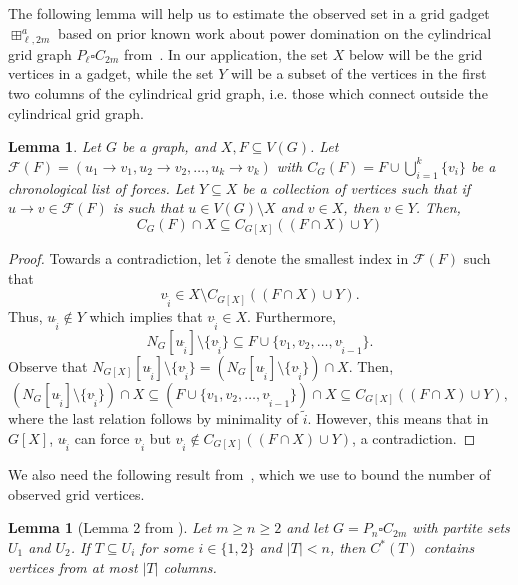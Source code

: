 \documentclass{article}
\newtheorem{lemma}[theorem]{Lemma}
\begin{document}
        The following lemma will help us to estimate the observed set in a grid gadget $\boxplus^a_{\ell,2m}$ based on prior known work about power domination on the cylindrical grid graph $P_{\ell}\square C_{2m}$ from~\cite{DH2006}.
        In our application, the set $X$ below will be the grid vertices in a gadget, while the set $Y$ will be a subset of the vertices in the first two columns of the cylindrical grid graph, i.e. those which connect outside the cylindrical grid graph. 

        \begin{lemma}\label{lemma forcing on an induced subgraph}
            Let $G$ be a graph, and $X, F\subseteq V(G)$. 
            Let $\mathcal{F}(F) =(u_1\to v_1, u_2\to v_2,\dots,u_k\to v_k)$ with $\displaystyle C_G(F)=F\cup\bigcup_{i=1}^k \{v_i\}$ be a chronological list of forces.
            Let $Y\subseteq X$ be a collection of vertices such that if $u\to v\in \mathcal{F}(F)$ is such that $u\in V(G)\setminus X$ and $v\in X$, then $v\in Y$.
            Then, 
            \[ C_G(F)\cap X\subseteq C_{G[X]}((F\cap X)\cup Y) \]
        \end{lemma}
        \begin{proof}
            Towards a contradiction, let $\tilde{i}$ denote the smallest index in $\mathcal{F}(F)$ such that 
                \[ \displaystyle v_{\tilde{i}}\in X\setminus C_{G[X]}((F\cap X)\cup Y). \]
           Thus, $u_{\tilde{i}}\not\in Y$ which implies that $v_{\tilde{i}}\in X$. 
            Furthermore,
                \[ N_G[u_{\tilde{i}}]\setminus \{v_{\tilde{i}}\}\subseteq F\cup \{v_1,v_2,\dots,v_{\tilde{i}-1}\}. \]
            Observe that $N_{G[X]}[u_{\tilde{i}}]\setminus \{v_{\tilde{i}}\}=(N_G[u_{\tilde{i}}]\setminus \{v_{\tilde{i}}\})\cap X$. 
            Then, 
                \[ (N_G[u_{\tilde{i}}]\setminus \{v_{\tilde{i}}\})\cap X\subseteq (F\cup \{v_1,v_2,\dots,v_{\tilde{i}-1}\})\cap X\subseteq C_{G[X]}((F\cap X)\cup Y), \]
            where the last relation follows by minimality of $\tilde{i}$.
            However, this means that in $G[X]$, $u_{\tilde{i}}$ can force $v_{\tilde{i}}$ but $v_{\tilde{i}} \not \in C_{G[X]}((F\cap X)\cup Y)$, a contradiction.
        \end{proof}

        We also need the following result from~\cite{DH2006}, which we use to bound the number of observed grid vertices.
        \begin{lemma}[Lemma 2 from \cite{DH2006}]\label{lemma star cover in cylider intersects columns}
            Let $m\geq n\geq 2$ and let $G=P_n\square C_{2m}$ with partite sets $U_1$ and $U_2$.
            If $T\subseteq U_i$ for some $i\in \{1,2\}$ and $|T|<n$, then $C^*(T)$ contains vertices from at most $|T|$ columns.
        \end{lemma}
        
\end{document}
